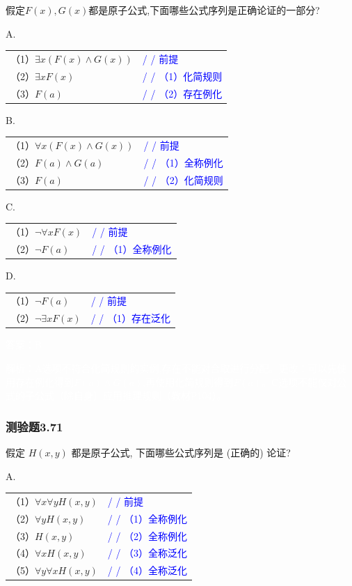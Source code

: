 \documentclass[UTF8, heading=true]{ctexart}
\begin{document}
假定$F(x),G(x)$都是原子公式,下面哪些公式序列是正确论证的一部分?

A.

\begin{tabular}{ll}
  （1）$\exists x(F(x) \wedge G(x))$ & \textcolor{blue}{/ / 前提} \\
  （2）$\exists x F(x)$ & \textcolor{blue}{/ / （1）化简规则} \\
  （3）$F(a)$ & \textcolor{blue}{/ / （2）存在例化}
\end{tabular}

B.

\begin{tabular}{ll}
  （1）$\forall x(F(x) \wedge G(x))$ & \textcolor{blue}{/ / 前提} \\
  （2）$F(a) \wedge G(a)$ & \textcolor{blue}{/ / （1）全称例化} \\
  （3）$F(a)$ & \textcolor{blue}{/ / （2）化简规则}
\end{tabular}


C.

\begin{tabular}{ll}
  （1）$\neg \forall x F(x)$ & \textcolor{blue}{/ / 前提} \\
  （2）$\neg F(a)$ & \textcolor{blue}{/ / （1）全称例化}
\end{tabular}

D.

\begin{tabular}{ll}
  （1）$\neg F(a)$ & \textcolor{blue}{/ / 前提} \\
  （2）$\neg \exists x F(x)$ & \textcolor{blue}{/ / （1）存在泛化}
\end{tabular}


\textcolor{white}{答案：B}

\textcolor{white}{解析：A选项不符合化简规则的实例,存在不能对合取进行分配。更改：可以先使用存在例化得到$F(a)\wedge G(a)$,再使用化简规则得到$F(a)$。C选项不能仅对公式的子公式（除自身）应用推理规则（教材P104）。}

\subsubsection{测验题3.71}

假定 $H(x, y)$ 都是原子公式, 下面哪些公式序列是 (正确的) 论证?

A.

\begin{tabular}{ll}
  （1）$\forall x \forall y H(x, y)$ & \textcolor{blue}{/ / 前提} \\
  （2）$\forall y H(x, y)$ & \textcolor{blue}{/ / （1）全称例化} \\
  （3）$H(x, y)$ & \textcolor{blue}{/ / （2）全称例化} \\
  （4）$\forall x H(x, y)$ & \textcolor{blue}{/ / （3）全称泛化} \\
  （5）$\forall y \forall x H(x, y)$ & \textcolor{blue}{/ / （4）全称泛化}
\end{tabular}
\end{document}
